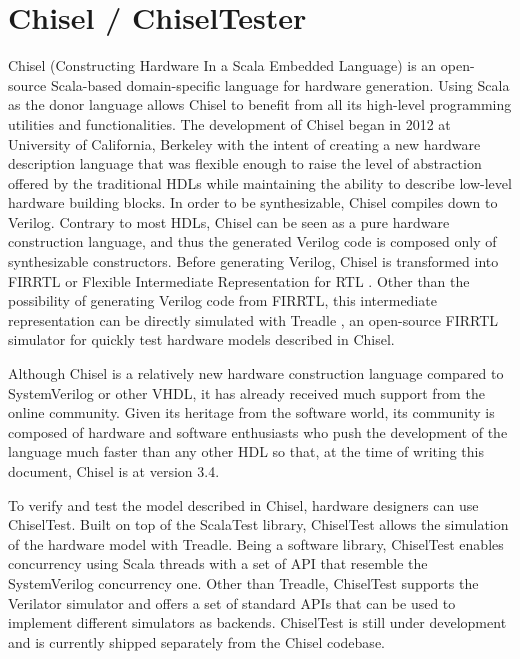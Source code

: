 \section{Chisel / ChiselTester}
Chisel (Constructing Hardware In a Scala Embedded Language)
\cite{bachrach2012chisel} is an open-source Scala-based domain-specific language
for hardware generation. Using Scala as the donor language allows Chisel to
benefit from all its high-level programming utilities and functionalities. The
development of Chisel began in 2012 at University of California, Berkeley with
the intent of creating a new hardware description language that was flexible
enough to raise the level of abstraction offered by the traditional HDLs while
maintaining the ability to describe low-level hardware building blocks. In order
to be synthesizable, Chisel compiles down to Verilog. Contrary to most HDLs,
Chisel can be seen as a pure hardware construction language, and thus the
generated Verilog code is composed only of synthesizable constructors. Before
generating Verilog, Chisel is transformed into FIRRTL or Flexible Intermediate
Representation for RTL \cite{8203780}. Other than the possibility of generating
Verilog code from FIRRTL, this intermediate representation can be directly
simulated with Treadle \cite{online:treadle}, an open-source FIRRTL simulator
for quickly test hardware models described in Chisel.

Although Chisel is a relatively new hardware construction language compared to
SystemVerilog or other VHDL, it has already received much support from the
online community. Given its heritage from the software world, its community is
composed of hardware and software enthusiasts who push the development of the
language much faster than any other HDL so that, at the time of writing this
document, Chisel is at version 3.4.

To verify and test the model described in Chisel, hardware designers can use
ChiselTest. Built on top of the ScalaTest \cite{ScalaTest} library, ChiselTest
allows the simulation of the hardware model with Treadle. Being a software
library, ChiselTest enables concurrency using Scala threads with a set of API
that resemble the SystemVerilog concurrency one. Other than Treadle, ChiselTest
supports the Verilator \cite{verilator} simulator and offers a set of standard
APIs that can be used to implement different simulators as backends. ChiselTest
is still under development and is currently shipped separately from the Chisel
codebase.

